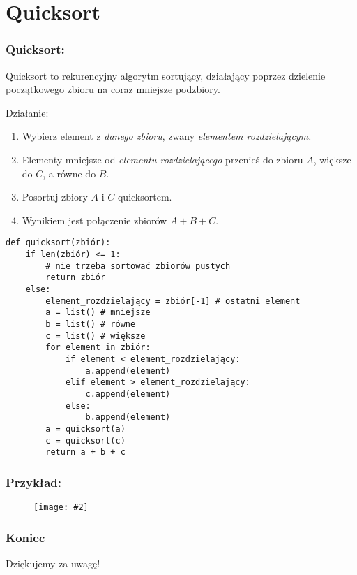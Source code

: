 \documentclass{beamer}
\newcommand{\obrazek}[2]{
        \begin{figure}[h]
            \centering
            \texttt{[image: \#2]}
        \end{figure}
    }
\begin{document}
\section{Quicksort}
\begin{frame}
    \frametitle{Quicksort:}
    Quicksort to rekurencyjny algorytm sortujący, działający poprzez dzielenie początkowego zbioru na coraz mniejsze podzbiory.
    \vspace{5mm}

    Działanie:
    \begin{enumerate}
        \item Wybierz element z \emph{danego zbioru}, zwany \emph{elementem rozdzielającym.}
        \item Elementy mniejsze od \emph{elementu rozdzielającego} przenieś do zbioru $A$, większe do $C$, a równe do $B$.
        \item Posortuj zbiory $A$ i $C$ quicksortem.
        \item Wynikiem jest połączenie zbiorów $A + B + C$.
    \end{enumerate}
\end{frame}

\begin{verbatim}
def quicksort(zbiór):
    if len(zbiór) <= 1:
        # nie trzeba sortować zbiorów pustych 
        return zbiór
    else:
        element_rozdzielający = zbiór[-1] # ostatni element
        a = list() # mniejsze
        b = list() # równe
        c = list() # większe
        for element in zbiór:
            if element < element_rozdzielający:
                a.append(element)
            elif element > element_rozdzielający:
                c.append(element)
            else:
                b.append(element)
        a = quicksort(a)
        c = quicksort(c)
        return a + b + c
\end{verbatim}

\begin{frame}
    \frametitle{Przykład:}
    \obrazek{.55}{quicksortExample.png}
\end{frame}

\begin{frame}
    \frametitle{Koniec}
    \begin{center}
        Dziękujemy za uwagę!
    \end{center}
\end{frame}
\end{document}
